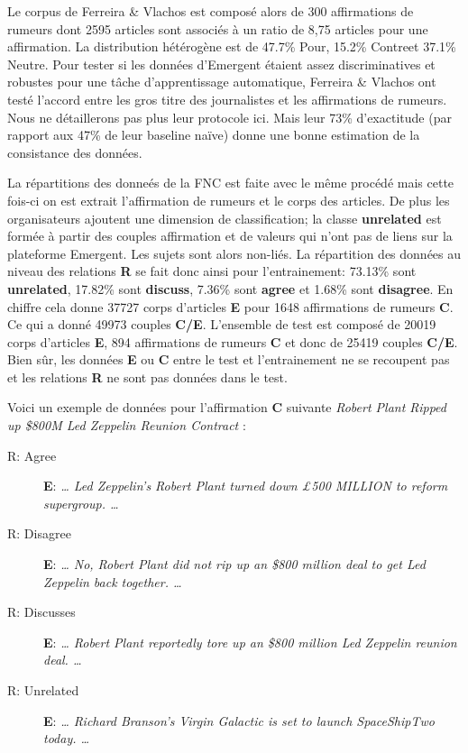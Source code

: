 \documentclass[onecolumn, 12pt]{article}
\begin{document}
Le corpus de Ferreira \& Vlachos est composé alors de 300 affirmations de rumeurs dont 2595 articles sont associés à un ratio de 8,75 articles pour une affirmation.
La distribution hétérogène  est de 47.7\% \og Pour\fg, 15.2\% \og Contre\fg et 37.1\% \og Neutre\fg.
Pour tester si les données d'Emergent étaient assez discriminatives et robustes pour une tâche d'apprentissage automatique, Ferreira \& Vlachos ont testé l'accord entre les gros titre des journalistes et les affirmations de rumeurs.
Nous ne détaillerons pas plus leur protocole ici.
Mais leur 73\% d'exactitude (par rapport aux 47\% de leur baseline naïve) donne une bonne estimation de la consistance des données.

La répartitions des donneés de la FNC est faite avec le même procédé mais cette fois-ci on est extrait l'affirmation de rumeurs et le corps des articles.
De plus les organisateurs ajoutent une dimension de classification; la classe \textbf{unrelated}  est formée à partir des couples affirmation et de valeurs qui n'ont pas de liens sur la plateforme Emergent.
Les sujets sont alors non-liés.
La répartition des données au niveau des relations \textbf{R} se fait donc ainsi pour l'entrainement: 73.13\% sont \textbf{unrelated}, 17.82\% sont \textbf{discuss}, 7.36\% sont \textbf{agree} et 1.68\% sont \textbf{disagree}.
En chiffre cela donne 37727 corps d'articles \textbf{E} pour 1648 affirmations de rumeurs \textbf{C}.
Ce qui a donné 49973 couples \textbf{C/E}.
L'ensemble de test est composé de 20019 corps d'articles \textbf{E}, 894 affirmations de rumeurs \textbf{C} et donc de 25419 couples \textbf{C/E}.
Bien sûr, les données \textbf{E} ou \textbf{C} entre le test et l'entrainement ne se recoupent pas et les relations \textbf{R} ne sont pas données dans le test.

Voici un exemple de données pour l'affirmation \textbf{C} suivante \og \textit{Robert Plant Ripped up \$800M Led Zeppelin Reunion Contract} \fg:

\begin{description}
 \item [R: Agree] \textbf{E}: \og \textit{ … Led Zeppelin’s Robert Plant turned down £500 MILLION to reform supergroup.
  … } \fg
 \item [R: Disagree] \textbf{E}: \og \textit{ … No, Robert Plant did not rip up an \$800 million deal to get Led Zeppelin back together.
  … } \fg
 \item [R: Discusses] \textbf{E}: \og \textit{ … Robert Plant reportedly tore up an \$800 million Led Zeppelin reunion deal.
  … } \fg
 \item [R: Unrelated] \textbf{E}: \og \textit{ … Richard Branson’s Virgin Galactic is set to launch SpaceShipTwo today.
  …} \fg
\end{description}
\end{document}
